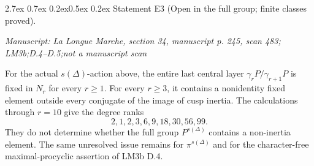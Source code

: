 \documentclass[11pt,a4paper]{article}
\makeatletter
\newcommand{\passage}[1]{\par\smallskip\noindent\textit{Manuscript: #1}\par\smallskip}
\renewcommand\paragraph{\@startsection{paragraph}{4}{\z@}%
  {2.7ex \@plus 0.7ex \@minus 0.2ex}{0.5ex \@plus 0.2ex}%
  {\normalfont\normalsize\bfseries}}
\makeatother
\begin{document}
\paragraph{Statement E3 (Open in the full group; finite classes proved).}\label{res:E3}
\passage{La Longue Marche, section 34, manuscript p. 245, scan 483; LM3b;D.4–D.5;not a manuscript scan}

For the actual $s(\Delta)$-action above, the entire last central layer $\gamma_rP/\gamma_{r+1}P$ is fixed in $N_r$ for every $r\ge1$. For every $r\ge3$, it contains a nonidentity fixed element outside every conjugate of the image of cusp inertia. The calculations through $r=10$ give the degree ranks
\[
 2,1,2,3,6,9,18,30,56,99.
\]
They do not determine whether the full group $P^{s(\Delta)}$ contains a non-inertia element. The same unresolved issue remains for $\pi^{s(\Delta)}$ and for the character-free maximal-procyclic assertion of LM3b D.4.
\end{document}
